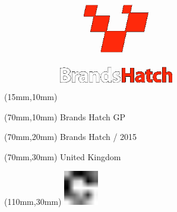 \null\newpage
\begin{textblock*}{50mm}(15mm,10mm)%
\includegraphics[width=50mm]{LG/BRH.png}
\end{textblock*}
\begin{textblock*}{130mm}(70mm,10mm)%
{\fontsize{20}{20}\selectfont Brands Hatch GP}\\
\end{textblock*}
\begin{textblock*}{120mm}(70mm,20mm)%
{\fontsize{16}{16}\selectfont Brands Hatch / 2015}\\
\end{textblock*}
\begin{textblock*}{120mm}(70mm,30mm)%
{\fontsize{12}{12}\selectfont United Kingdom}
\end{textblock*}
\begin{textblock*}{30mm}(110mm,30mm)%
\centering
\includegraphics[height=15mm]{icons/fa-rotate-right.pdf}
\end{textblock*}
